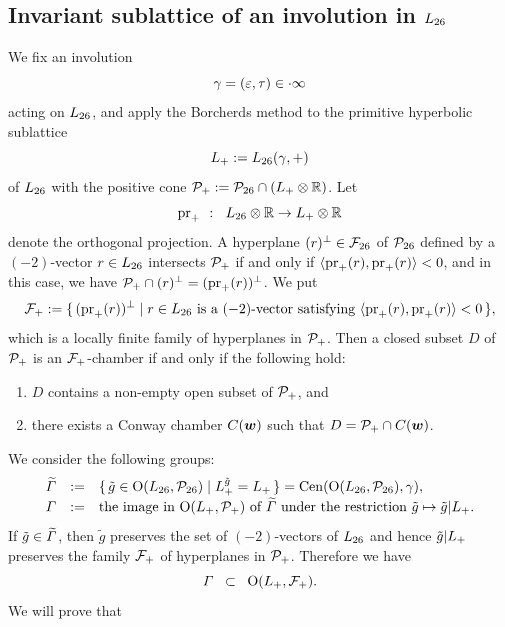 \documentclass{amsart} %
\begin{document}
\subsection{Invariant sublattice of an involution in $L_{26}$}\label{subsec:sublatLts}
%
We fix an involution
%
\begin{equation*}\label{eq:gamma}
\gamma=(\varepsilon, \tau)\in \cdot \infty
\end{equation*}
%
 acting on $L_{26}$, and 
 apply the Borcherds method to the primitive hyperbolic sublattice
\[
L_{+}:=L_{26}(\gamma, +)
\]
of $L_{26}$ 
with the positive cone $\mathord{\mathcal{P}}_{+}:=\mathord{\mathcal{P}}_{26}\cap(L_{+}\otimes \mathord{\mathbb{R}})$.
Let
\[
\operatorname{pr}_{+}\;\;\colon\;\; L_{26}\otimes \mathord{\mathbb{R}} \to L_{+}\otimes \mathord{\mathbb{R}}
\]
denote the orthogonal projection.
A hyperplane $(r)^{\perp}\in {\mathord{\mathcal{F}}}_{26}$ of $\mathord{\mathcal{P}}_{26}$
defined by a $(-2)$-vector $r\in L_{26}$
intersects $\mathord{\mathcal{P}}_{+}$
if and only if
$\langle \operatorname{pr}_{+}(r), \operatorname{pr}_{+}(r) \rangle<0$,
and in this case,
we have $ \mathord{\mathcal{P}}_{+}\cap (r)^{\perp}=(\operatorname{pr}_{+}(r))^{\perp}$.
We put
\[
\mathord{\mathcal{F}}_{+}:=\{\,{(\operatorname{pr}_{+}(r))^{\perp}}\mid {\textrm{$r\in L_{26}$ is a $(-2)$-vector satisfying 
$\langle \operatorname{pr}_{+}(r), \operatorname{pr}_{+}(r) \rangle<0$}} \,\},
\]
which is a locally finite family of hyperplanes in $\mathord{\mathcal{P}}_{+}$.
Then a closed subset $D$ of $\mathord{\mathcal{P}}_{+}$ is 
an $\mathord{\mathcal{F}}_{+}$-chamber if and only if the following hold:
%
\begin{enumerate}[label=(\alph*)]
\item 
$D$ contains a non-empty open subset of $\mathord{\mathcal{P}}_{+}$, and 
\item there exists a Conway chamber $\mathord{C}(\boldsymbol{w})$
such that $D=\mathord{\mathcal{P}}_{+}\cap \mathord{C}(\boldsymbol{w})$.
\end{enumerate}
%
We consider the following groups: 
%
\begin{equation}\label{eq:vGamdef}
\renewcommand{\arraystretch}{1.2}
\begin{array}{ccl}
\tilvGam &:=& \set{\tilde{g}\in \OG(\Lts, \PPPts)}{\Lplus^{\tilde{g}}=\Lplus}=\Cen(\OG(\Lts, \PPPts), \gamma), \\
\vGam &:=& \textrm{the image in $\OG(\Lplus, \PPPplus)$ of $\tilvGam$ under the restriction %
$\tilde{g}\mapsto \tilde{g}|\Lplus$}.
\end{array}
\end{equation}
%
If $\tilde{g}\in \widetilde{\varGamma}$,
then $\tilde{g}$ preserves the set of $(-2)$-vectors of $L_{26}$ and hence $\tilde{g}|L_{+}$
preserves the family $\mathord{\mathcal{F}}_{+}$ of hyperplanes in $\mathord{\mathcal{P}}_{+}$.
Therefore we have
\[
\varGamma\;\;\subset \;\; \mathord{\mathrm{O}}(L_{+}, \mathord{\mathcal{F}}_{+}).
\]
We will prove that 
\end{document}

